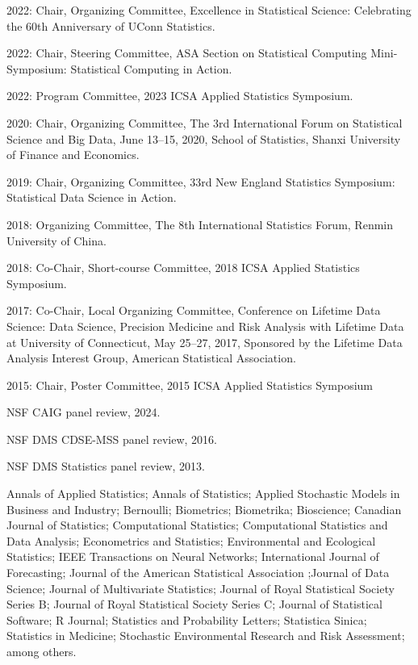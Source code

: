 \documentclass[Statistics]{vita}
\begin{document}
\begin{vita}
\begin{Services}
\begin{Conferences}
  \item 2022: Chair, Organizing Committee, Excellence in Statistical Science: Celebrating the 60th Anniversary of UConn Statistics.
  \item 2022: Chair, Steering Committee, ASA Section on Statistical Computing Mini-Symposium: Statistical Computing in Action.
  \item 2022: Program Committee, 2023 ICSA Applied Statistics Symposium.
  \item 2020: Chair, Organizing Committee, The 3rd International Forum on Statistical Science and Big Data, June 13--15, 2020, School of Statistics, Shanxi University of Finance and Economics.
  \item 2019: Chair, Organizing Committee, 33rd New England Statistics Symposium: Statistical Data Science in Action.
  \item 2018: Organizing Committee, The 8th International Statistics Forum, Renmin University of China.
  \item 2018: Co-Chair, Short-course Committee, 2018 ICSA Applied Statistics Symposium.
  \item 2017: Co-Chair, Local Organizing Committee,  Conference on Lifetime Data Science: Data Science, Precision Medicine and Risk Analysis with Lifetime Data at University of Connecticut, May 25--27, 2017, Sponsored by the Lifetime Data Analysis Interest Group, American Statistical Association.
  \item 2015: Chair, Poster Committee, 2015 ICSA Applied Statistics Symposium
  \end{Conferences}
  \begin{GrantReviews}
  \item NSF CAIG panel review, 2024.
  \item NSF DMS CDSE-MSS panel review, 2016.
  \item NSF DMS Statistics panel review, 2013.
  \end{GrantReviews}
  \begin{JournalReviews}
  \item Annals of Applied Statistics; Annals of Statistics; Applied Stochastic Models in Business and Industry; Bernoulli; Biometrics; Biometrika; Bioscience; Canadian Journal of Statistics; Computational Statistics; Computational Statistics and Data Analysis; Econometrics and Statistics; Environmental and Ecological Statistics; IEEE Transactions on Neural Networks; International Journal of Forecasting; Journal of the American Statistical Association ;Journal of Data Science; Journal of Multivariate Statistics; Journal of Royal Statistical Society Series B; Journal of Royal Statistical Society Series C; Journal of Statistical Software; R Journal; Statistics and Probability Letters; Statistica Sinica; Statistics in Medicine; Stochastic Environmental Research and Risk Assessment; among others.

\end{JournalReviews}
\end{Services}
\end{vita}
\end{document}
